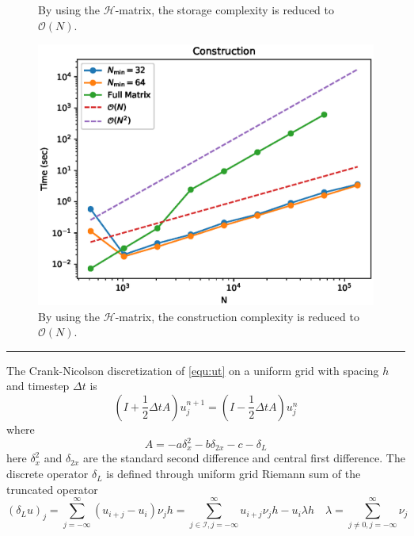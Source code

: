 \documentclass[10pt,a4paper]{article}
\theoremstyle{definition}
\begin{document}
\begin{figure}[htpb]
\centering
\scalebox{0.6}{}
\caption{By using the $\mathcal{H}$-matrix, the storage complexity is reduced to $\mathcal{O}(N)$.}
\label{fig:storage}
\end{figure}

\begin{figure}[htpb]
\centering
\includegraphics[scale=0.6]{figures/construction.eps}
\caption{By using the $\mathcal{H}$-matrix, the construction complexity is reduced to $\mathcal{O}(N)$.}
\label{fig:construction}
\end{figure}

\hrule


The Crank-Nicolson discretization of \cref{equ:ut} on a uniform grid with spacing $h$ and timestep $\Delta t$ is 
\begin{equation}
	(I+\frac{1}{2}\Delta tA)u_j^{n+1} = (I-\frac{1}{2}\Delta tA)u_j^n
\end{equation}
where 
\begin{equation}
	A = -a\delta_x^2 - b\delta_{2x} - c - \delta_L
\end{equation}
here $\delta_x^2$ and $\delta_{2x}$ are the standard second difference and central first difference. The discrete operator $\delta_L$ is defined through uniform grid Riemann sum of the truncated operator
\begin{equation}\label{equ:dl}
	(\delta_L u)_j = \sum_{j=-\infty}^\infty (u_{i+j}-u_i)\nu_j h =  \sum_{j\in \mathcal{I}, j=-\infty}^\infty u_{i+j}\nu_j h - u_i \lambda h\quad \lambda = \sum_{j\neq 0, j=-\infty}^\infty \nu_j
\end{equation}
\end{document}
